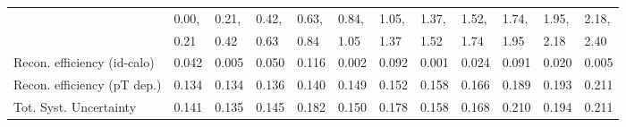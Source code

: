 \begin{tabular}{l|p{0.6cm}p{0.6cm}p{0.6cm}p{0.6cm}p{0.6cm}p{0.6cm}p{0.6cm}p{0.6cm}p{0.6cm}p{0.6cm}p{0.6cm}}
\hline
   & 0.00, & 0.21, & 0.42, & 0.63, & 0.84, & 1.05, & 1.37, & 1.52, & 1.74, & 1.95, & 2.18,  \\ 
   & 0.21 & 0.42 & 0.63 & 0.84 & 1.05 & 1.37 & 1.52 & 1.74 & 1.95 & 2.18 & 2.40  \\ 
\hline
Recon. efficiency (id-calo)              & 0.042 & 0.005 & 0.050 & 0.116 & 0.002 & 0.092 & 0.001 & 0.024 & 0.091 & 0.020 & 0.005 \\
\hline
Recon. efficiency (pT dep.)              & 0.134 & 0.134 & 0.136 & 0.140 & 0.149 & 0.152 & 0.158 & 0.166 & 0.189 & 0.193 & 0.211 \\
\hline
Tot. Syst. Uncertainty                   & 0.141 & 0.135 & 0.145 & 0.182 & 0.150 & 0.178 & 0.158 & 0.168 & 0.210 & 0.194 & 0.211 \\
\hline
\end{tabular}
